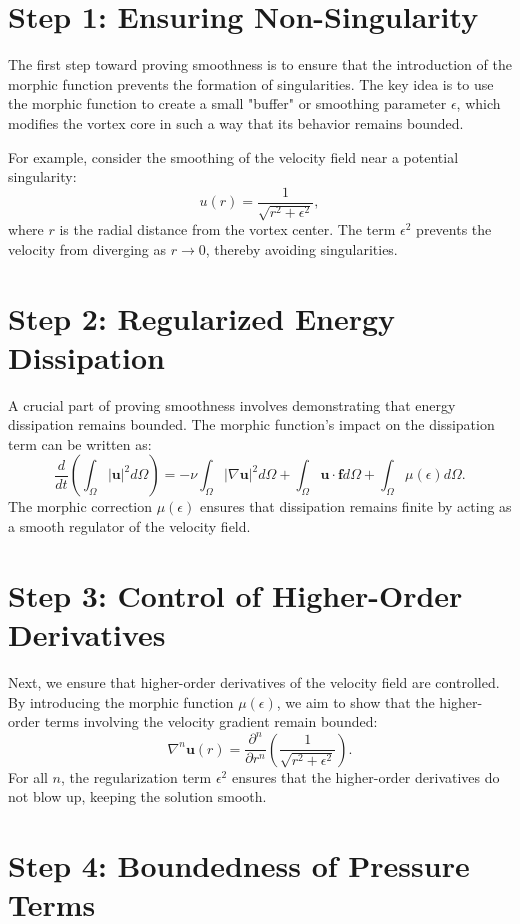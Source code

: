 \documentclass{article}
\begin{document}
\section{Step 1: Ensuring Non-Singularity}

The first step toward proving smoothness is to ensure that the introduction of the morphic function prevents the formation of singularities. The key idea is to use the morphic function to create a small "buffer" or smoothing parameter \( \epsilon \), which modifies the vortex core in such a way that its behavior remains bounded.

For example, consider the smoothing of the velocity field near a potential singularity:
\[
u(r) = \frac{1}{\sqrt{r^2 + \epsilon^2}},
\]
where \( r \) is the radial distance from the vortex center. The term \( \epsilon^2 \) prevents the velocity from diverging as \( r \to 0 \), thereby avoiding singularities.

\section{Step 2: Regularized Energy Dissipation}

A crucial part of proving smoothness involves demonstrating that energy dissipation remains bounded. The morphic function's impact on the dissipation term can be written as:
\[
\frac{d}{dt} \left( \int_{\Omega} |\mathbf{u}|^2 d\Omega \right) = -\nu \int_{\Omega} |\nabla \mathbf{u}|^2 d\Omega + \int_{\Omega} \mathbf{u} \cdot \mathbf{f} d\Omega + \int_{\Omega} \mu(\epsilon) d\Omega.
\]
The morphic correction \( \mu(\epsilon) \) ensures that dissipation remains finite by acting as a smooth regulator of the velocity field.

\section{Step 3: Control of Higher-Order Derivatives}

Next, we ensure that higher-order derivatives of the velocity field are controlled. By introducing the morphic function \( \mu(\epsilon) \), we aim to show that the higher-order terms involving the velocity gradient remain bounded:
\[
\nabla^n \mathbf{u}(r) = \frac{\partial^n}{\partial r^n} \left( \frac{1}{\sqrt{r^2 + \epsilon^2}} \right).
\]
For all \( n \), the regularization term \( \epsilon^2 \) ensures that the higher-order derivatives do not blow up, keeping the solution smooth.

\section{Step 4: Boundedness of Pressure Terms}
\end{document}
